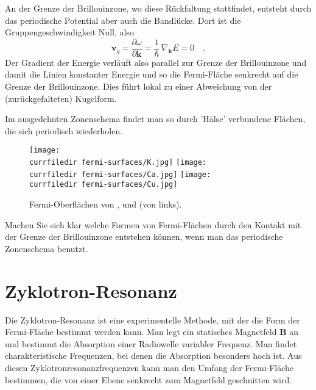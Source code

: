 An der Grenze der Brillouinzone, wo diese Rückfaltung stattfindet, entsteht durch das periodische Potential aber auch die Bandlücke. Dort ist die Gruppengeschwindigkeit Null, also 
\begin{equation}
 \mathbf{v}_g = \frac{\partial \omega}{\partial \mathbf{k}} = \frac{1}{\hbar} \, \nabla_\mathbf{k} E = 0  \quad .
\end{equation}
Der Gradient der Energie verläuft also parallel zur Grenze der Brillouinzone und damit die Linien konstanter Energie und so die Fermi-Fläche senkrecht auf die Grenze der Brillouinzone. Dies führt lokal zu einer Abweichung von der (zurückgefalteten) Kugelform. 

Im ausgedehnten Zonenschema findet man so durch 'Hälse' verbundene Flächen, die sich periodisch wiederholen.


\begin{figure}
   \texttt{[image: \\currfiledir fermi-surfaces/K.jpg]}
  \hspace*{1mm}
   \texttt{[image: \\currfiledir fermi-surfaces/Ca.jpg]}
   \hspace*{1mm}
   \texttt{[image: \\currfiledir fermi-surfaces/Cu.jpg]}

   \caption{Fermi-Oberflächen von ,  und  (von links). \cite{Choy00_fermi_surfaces} }
   \label{fig:4_fermi_surfaces}
\end{figure}
    

\begin{questions}
   \item Machen Sie sich klar welche Formen von Fermi-Flächen durch den Kontakt mit der Grenze der Brillouinzone entstehen können, wenn man das periodische Zonenschema benutzt.
\end{questions}

\section{Zyklotron-Resonanz}

Die Zyklotron-Resonanz ist eine experimentelle Methode, mit der die Form der Fermi-Fläche bestimmt werden kann. Man legt ein statisches Magnetfeld $\mathbf{B}$ an und bestimmt die Absorption einer Radiowelle variabler Frequenz. Man findet charakteristische Frequenzen, bei denen die Absorption besonders hoch ist. Aus diesen Zyklotronresonanzfrequenzen kann man den Umfang der Fermi-Fläche bestimmen, die von einer Ebene senkrecht zum Magnetfeld geschnitten wird.


